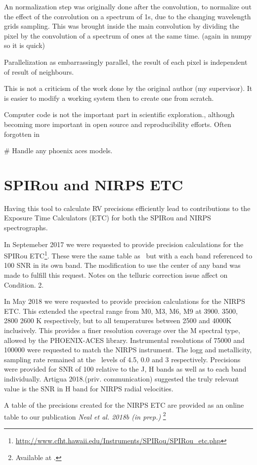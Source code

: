 An normalization step was originally done after the convolution, to normalize out the effect of the convolution on a spectrum of 1s, due to the changing wavelength grids sampling. This was brought inside the main convolution by dividing the pixel by the convolution of a spectrum of ones at the same time. (again in numpy so it is quick)

Parallelization as embarrassingly parallel, the result of each pixel is independent of result of neighbours.

This is not a criticism of the work done by the original author (my supervisor). It is easier to modify a working system then to create one from scratch.

Computer code is not the important part in scientific exploration., although becoming more important in open source and reproducibility efforts. Often forgotten in

\# Handle any phoenix aces models.


\section{SPIRou and NIRPS ETC}
Having this tool to calculate RV precisions efficiently lead to contributions to the Exposure Time Calculators (ETC) for both the SPIRou and NIRPS spectrographs.

In Septemeber 2017 we were requested to provide precision calculations for the SPIRou ETC\footnote{\url{http://www.cfht.hawaii.edu/Instruments/SPIRou/SPIRou_etc.php}}. These were the same table as~\citet{figueira_radial_2016} but with a each band referenced to 100 SNR in its own band. The modification to use the center of any band was made to fulfill this request. Notes on the telluric correction issue affect on Condition. 2.

In May 2018 we were requested to provide precision calculations for the NIRPS ETC. This extended the spectral range from M0, M3, M6, M9 at 3900. 3500, 2800 2600 K respectively, but to all temperatures between 2500 and 4000K inclusively. This provides a finer resolution coverage over the M spectral type, allowed by the PHOENIX-ACES library.
Instrumental resolutions of 75000 and 100000 were requested to match the NIRPS instrument.
The logg and metallicity, sampling rate remained at the~\citet{figueira_radial_2016} levels of 4.5, 0.0 and 3 respectively.
Precisions were provided for SNR of 100 relative to the J, H bands as well as to each band individually. Artigua 2018.(priv. communication) suggested the truly relevant value is the SNR in H band for NIRPS radial velocities.

A table of the precisions created for the NIRPS ETC are provided as an online table to our publication \textit{Neal et al. 2018b (in prep.)} \footnote{Available at \url{}.} 
